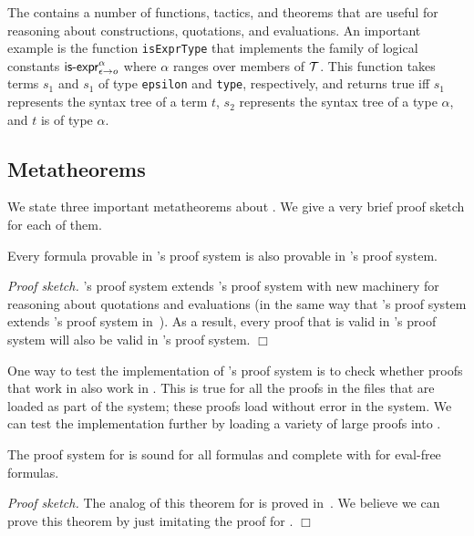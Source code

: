 \documentclass[fleqn]{llncs}
\begin{document}
The {\HLQE} contains a number of {\HOL} functions, tactics, and
theorems that are useful for reasoning about constructions,
quotations, and evaluations.  An important example is the {\HOL}
function \texttt{isExprType} that implements the {\churchqe} family
of logical constants $\mbox{\sf is-expr}_{\epsilon \rightarrow o}^{\alpha}$
where $\alpha$ ranges over members of $\mbox{$\cal T$}$.  This function takes
terms $s_1$ and $s_1$ of type \texttt{epsilon} and \texttt{type},
respectively, and returns true iff $s_1$ represents
the syntax tree of a term $t$, $s_2$ represents the syntax tree of a
type $\alpha$, and $t$ is of type $\alpha$.

\subsection{Metatheorems}

We state three important metatheorems about {\HLQE}.  We give a very
brief proof sketch for each of them.

\begin{theorem}\bsp
Every formula provable in {\HL}'s proof system is also provable in
{\HLQE}'s proof system.\esp
\end{theorem}

\noindent
\emph{Proof sketch.}  {\HLQE}'s proof system extends {\HL}'s proof
system with new machinery for reasoning about quotations and
evaluations (in the same way that {\churchqe}'s proof system extends
{\qzero}'s proof system in~\cite{Farmer18}).  As a result, every proof
that is valid in {\HL}'s proof system will also be valid in {\HLQE}'s
proof system.  $\Box$

\bigskip

One way to test the implementation of {\HLQE}'s proof system is to
check whether proofs that work in {\HL} also work in {\HLQE}.  This is
true for all the proofs in the files that are loaded as part of the
{\HL} system; these proofs load without error in the {\HLQE} system.
We can test the implementation further by loading a variety of large
{\HL} proofs into {\HLQE}.

\begin{theorem}
The proof system for {\HLQE} is sound for all formulas and complete
with for eval-free formulas.
\end{theorem}

\noindent
\emph{Proof sketch.}  The analog of this theorem for {\churchqe} is
proved in~\cite{Farmer18}.  We believe we can prove this theorem by just
imitating the proof for {\churchqe}. $\Box$
\end{document}
